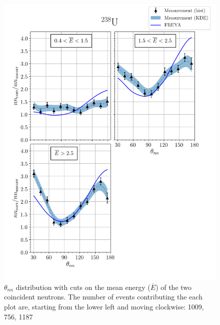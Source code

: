 \begin{figure}
\centering
    \includegraphics[width = 1.1\textwidth]{Content/Results/FinalDUResultw_freya1KDE.png}
    \caption{$\theta_{nn}$ distribution with cuts on the mean energy ($\overline{E}$) of the two coincident neutrons.
    The number of events contributing the each plot are, starting from the lower left and moving clockwise: 1009, 756, 1187 }
    \label{fig:DU(1)}
\end{figure}

